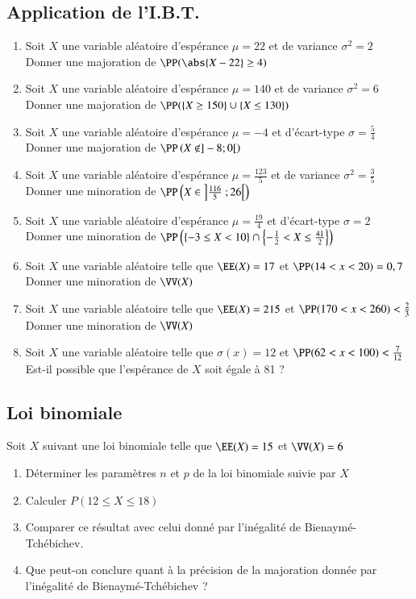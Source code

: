 \documentclass[oneside,12pt]{article}          %
\begin{document}
\subsection{Application de l'I.B.T.}
\begin{enumerate}\setlength{\itemsep}{0pt}
    \item Soit $X$ une variable aléatoire d'espérance $\mu=22$ et de variance $\sigma^2=2$\\
    Donner une majoration de $\PP(\abs{X-22}\geq4)$
    \item Soit $X$ une variable aléatoire d'espérance $\mu=140$ et de variance $\sigma^2=6$\\
    Donner une majoration de $\PP(\{X\geq150\}\cup\{X\leq130\})$
    \item Soit $X$ une variable aléatoire d'espérance $\mu=-4$ et d'écart-type $\sigma=\frac{5}{4}$\\
    Donner une majoration de $\PP\left(X\notin]-8;0[\right)$
    \item Soit $X$ une variable aléatoire d'espérance $\mu=\frac{123}{5}$ et de variance $\sigma^2=\frac{3}{5}$\\
    Donner une minoration de $\PP\left(X\in\left]\frac{116}{5}~;26\right[\right)$
    \item Soit $X$ une variable aléatoire d'espérance $\mu=\frac{19}{4}$ et d'écart-type $\sigma=2$\\
    Donner une minoration de $\PP\left(\{-3\leq X<10\}\cap\left\{-\frac{1}{2}<X\leq\frac{41}{2}\right\}\right)$
    \item Soit $X$ une variable aléatoire telle que $\EE(X)=17$ et $\PP(14<x<20)=0,7$\\
    Donner une minoration de $\VV(X)$
    \item Soit $X$ une variable aléatoire telle que $\EE(X)=215$ et $\PP(170<x<260)<\frac{2}{3}$\\
    Donner une minoration de $\VV(X)$
    \item Soit $X$ une variable aléatoire telle que $\sigma(x)=12$ et $\PP(62<x<100)<\frac{7}{12}$\\
    Est-il possible que l'espérance de $X$ soit égale à 81 ?
\end{enumerate}



\subsection{Loi binomiale}
Soit $X$ suivant une loi binomiale telle que $\EE(X)=15$ et $\VV(X)=6$
\begin{enumerate}
    \item Déterminer les paramètres $n$ et $p$ de la loi binomiale suivie par $X$
    \item Calculer $P(12\leq X\leq18)$
    \item Comparer ce résultat avec celui donné par l'inégalité de Bienaymé-Tchébichev.
    \item Que peut-on conclure quant à la précision de la majoration donnée par l'inégalité de Bienaymé-Tchébichev ?
\end{enumerate}
\end{document}
